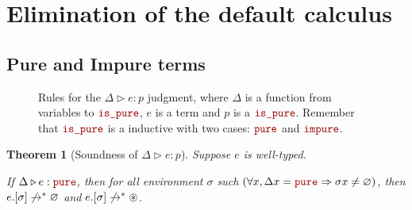 \documentclass{scrartcl}
\newcommand{\limply}{\Rightarrow}
\newtheorem{theorem}{Theorem}
\theoremstyle{definition}
\begin{document}
\section{Elimination of the default calculus}

\subsection{Pure and Impure terms}


\begin{figure}
    \begin{mathpar}





    \end{mathpar}
    \caption{\label{judgment:ispure}Rules for the $\Delta \triangleright e : p$ judgment, where $\Delta$ is a function from variables to $\synispure$, $e$ is a term and $p$ is a $\synispure$. Remember that $\synispure$ is a inductive with two cases: $\synpure$ and $\synimpure$.}
\end{figure}

\begin{theorem}[Soundness of $\Delta \triangleright e : p$]
    Suppose $e$ is well-typed.

    If $\Delta \triangleright e : \synpure$, then for all environment $\sigma$ such $(\forall x, \Delta x = \synpure \limply \sigma x \neq \synempty)$, then $e.[\sigma] \not\to^* \synempty$ and $e.[\sigma] \not\to^* \synconflict$.
\end{theorem}
\end{document}
